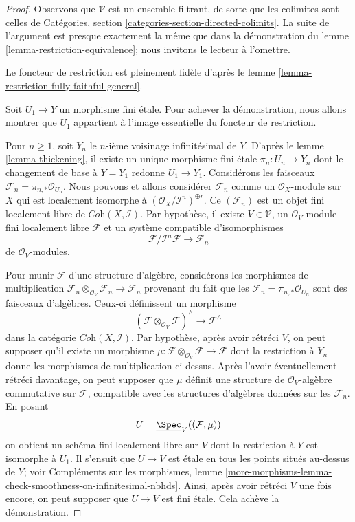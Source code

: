 \begin{proof}
Observons que $\mathcal{V}$ est un ensemble filtrant, de sorte que les colimites sont
celles de Catégories, section \ref{categories-section-directed-colimits}.
La suite de l'argument est presque exactement la même que dans la démonstration
du lemme \ref{lemma-restriction-equivalence}; nous invitons le lecteur
à l'omettre.

\medskip\noindent
Le foncteur de restriction est pleinement fidèle d'après le
lemme \ref{lemma-restriction-fully-faithful-general}.

\medskip\noindent
Soit $U_1 \to Y$ un morphisme fini étale. Pour achever la démonstration,
nous allons montrer que $U_1$ appartient à l'image essentielle du
foncteur de restriction.

\medskip\noindent
Pour $n \geq 1$, soit $Y_n$ le $n$-ième voisinage infinitésimal de $Y$.
D'après le lemme \ref{lemma-thickening},
il existe un unique morphisme fini étale
$\pi_n : U_n \to Y_n$ dont le changement de base à $Y = Y_1$
redonne $U_1 \to Y_1$.
Considérons les faisceaux $\mathcal{F}_n = \pi_{n, *}\mathcal{O}_{U_n}$.
Nous pouvons et allons considérer $\mathcal{F}_n$ comme un $\mathcal{O}_X$-module sur $X$
qui est localement isomorphe à
$(\mathcal{O}_X/\mathcal{I}^n)^{\oplus r}$.
Ce $(\mathcal{F}_n)$ est un objet fini localement libre de
$\textit{Coh}(X, \mathcal{I})$.
Par hypothèse, il existe $V \in \mathcal{V}$,
un $\mathcal{O}_V$-module fini localement libre $\mathcal{F}$
et un système compatible d'isomorphismes
$$
\mathcal{F}/\mathcal{I}^n\mathcal{F} \to \mathcal{F}_n
$$
de $\mathcal{O}_V$-modules.

\medskip\noindent
Pour munir $\mathcal{F}$ d'une structure d'algèbre, considérons les
morphismes de multiplication
$\mathcal{F}_n \otimes_{\mathcal{O}_V} \mathcal{F}_n \to \mathcal{F}_n$
provenant du fait que les $\mathcal{F}_n = \pi_{n, *}\mathcal{O}_{U_n}$
sont des faisceaux d'algèbres. Ceux-ci définissent un morphisme
$$
(\mathcal{F}\otimes_{\mathcal{O}_V} \mathcal{F})^\wedge
\longrightarrow
\mathcal{F}^\wedge
$$
dans la catégorie $\textit{Coh}(X, \mathcal{I})$. Par hypothèse,
après avoir rétréci $V$, on peut supposer qu'il existe un morphisme
$\mu : \mathcal{F}\otimes_{\mathcal{O}_V} \mathcal{F} \to \mathcal{F}$
dont la restriction à $Y_n$ donne les morphismes de multiplication ci-dessus.
Après l'avoir éventuellement rétréci davantage, on peut supposer que $\mu$
définit une structure de $\mathcal{O}_V$-algèbre commutative
sur $\mathcal{F}$, compatible avec les structures d'algèbres données
sur les $\mathcal{F}_n$.
En posant
$$
U = \underline{\Spec}_V((\mathcal{F}, \mu))
$$
on obtient un schéma fini localement libre sur $V$ dont la restriction
à $Y$ est isomorphe à $U_1$. Il s'ensuit que $U \to V$
est étale en tous les points situés au-dessus de $Y$; voir
Compléments sur les morphismes, lemme
\ref{more-morphisms-lemma-check-smoothness-on-infinitesimal-nbhds}.
Ainsi, après avoir rétréci $V$ une fois encore, on peut supposer que $U \to V$ est
fini étale. Cela achève la démonstration.
\end{proof}

